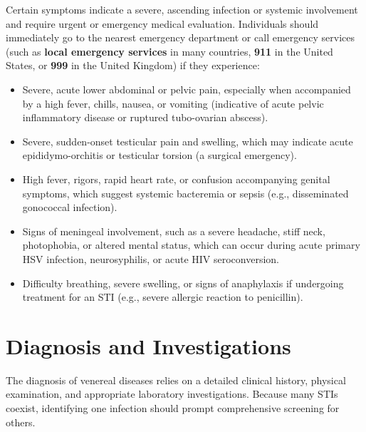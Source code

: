 Certain symptoms indicate a severe, ascending infection or systemic involvement and require urgent or emergency medical evaluation. Individuals should immediately go to the nearest emergency department or call emergency services (such as \textbf{local emergency services} in many countries, \textbf{911} in the United States, or \textbf{999} in the United Kingdom) if they experience:
\begin{itemize}
    \item Severe, acute lower abdominal or pelvic pain, especially when accompanied by a high fever, chills, nausea, or vomiting (indicative of acute pelvic inflammatory disease or ruptured tubo-ovarian abscess).
    \item Severe, sudden-onset testicular pain and swelling, which may indicate acute epididymo-orchitis or testicular torsion (a surgical emergency).
    \item High fever, rigors, rapid heart rate, or confusion accompanying genital symptoms, which suggest systemic bacteremia or sepsis (e.g., disseminated gonococcal infection).
    \item Signs of meningeal involvement, such as a severe headache, stiff neck, photophobia, or altered mental status, which can occur during acute primary HSV infection, neurosyphilis, or acute HIV seroconversion.
    \item Difficulty breathing, severe swelling, or signs of anaphylaxis if undergoing treatment for an STI (e.g., severe allergic reaction to penicillin).
\end{itemize}

\section*{Diagnosis and Investigations}
The diagnosis of venereal diseases relies on a detailed clinical history, physical examination, and appropriate laboratory investigations. Because many STIs coexist, identifying one infection should prompt comprehensive screening for others.

